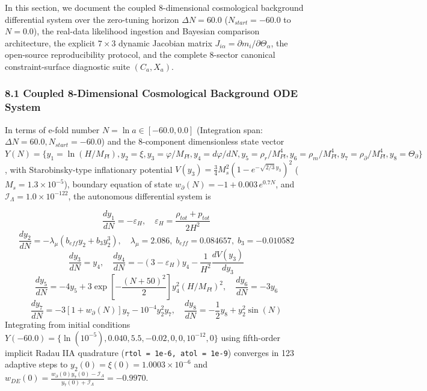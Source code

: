 \documentclass[aps,prd,onecolumn,superscriptaddress,nofootinbib,longbibliography,10pt]{revtex4-2}
\begin{document}
{{  In this section, we document the coupled 8-dimensional cosmological background differential system over the zero-tuning horizon \(\Delta N = 60.0\) (\(N_{start} = -60.0\) to \(N = 0.0\)), the real-data likelihood ingestion and Bayesian comparison architecture, the explicit \(7 \times 3\) dynamic Jacobian matrix \(J_{i\alpha} = \partial m_i/\partial\Theta_\alpha\), the open-source reproducibility protocol, and the complete 8-sector canonical constraint-surface diagnostic suite \((C_a, X_a)\).


  
  
\subsubsection*{8.1 Coupled 8-Dimensional Cosmological Background ODE System}

  In terms of e-fold number \(N = \ln a \in [-60.0, 0.0]\) (Integration span: \(\Delta N = 60.0, N_{start} = -60.0\)) and the 8-component dimensionless state vector \(Y(N) = \{y_1 = \ln(H/M_{Pl}), y_2 = \xi, y_3 = \varphi/M_{Pl}, y_4 = d\varphi/dN, y_5 = \rho_r/M_{Pl}^4, y_6 = \rho_m/M_{Pl}^4, y_7 = \rho_\partial/M_{Pl}^4, y_8 = \Theta_\partial\}\), with Starobinsky-type inflationary potential \(V(y_3) = \frac{3}{4}M_s^2(1 - e^{-\sqrt{2/3}\,y_3})^2\) (\(M_s = 1.3 \times 10^{-5}\)), boundary equation of state \(w_\partial(N) = -1 + 0.003\,e^{0.7N}\), and \(\mathcal{I}_\Lambda = 1.0 \times {10^{-122}}\), the autonomous differential system is


  \[ \frac{dy_1}{dN} = -\varepsilon_H, \quad \varepsilon_H = \frac{\rho_{tot} + p_{tot}}{2H^2} \]
  \[ \frac{dy_2}{dN} = -\lambda_\mu (b_{eff}y_2 + b_3 y_2^3), \quad \lambda_\mu = 2.086, \; b_{eff} = 0.084657, \; b_3 = -0.010582 \]
  \[ \frac{dy_3}{dN} = y_4, \quad \frac{dy_4}{dN} = -(3 - \varepsilon_H)y_4 - \frac{1}{H^2}\frac{dV(y_3)}{dy_3} \]
  \[ \frac{dy_5}{dN} = -4y_5 + 3\exp\left[-\frac{(N + 50)^2}{2}\right]y_4^2 (H/M_{Pl})^2, \quad \frac{dy_6}{dN} = -3y_6 \]
  \[ \frac{dy_7}{dN} = -3[1 + w_\partial(N)]y_7 - 10^{-4}y_2^2 y_7, \quad \frac{dy_8}{dN} = -\frac{1}{2}y_8 + y_2^2 \sin(N) \]
  Integrating from initial conditions \(Y(-60.0) = \{\ln(10^{-5}), 0.040, 5.5, -0.02, 0, 0, 10^{-12}, 0\}\) using fifth-order implicit Radau IIA quadrature (\texttt{rtol = 1e-6, atol = 1e-9}) converges in 123 adaptive steps to \(y_2(0) = \xi(0) = 1.0003 \times 10^{-6}\) and \(w_{DE}(0) = \frac{w_\partial(0)y_7(0) - \mathcal{I}_\Lambda}{y_7(0) + \mathcal{I}_\Lambda} = -0.9970\).



}}
\end{document}
